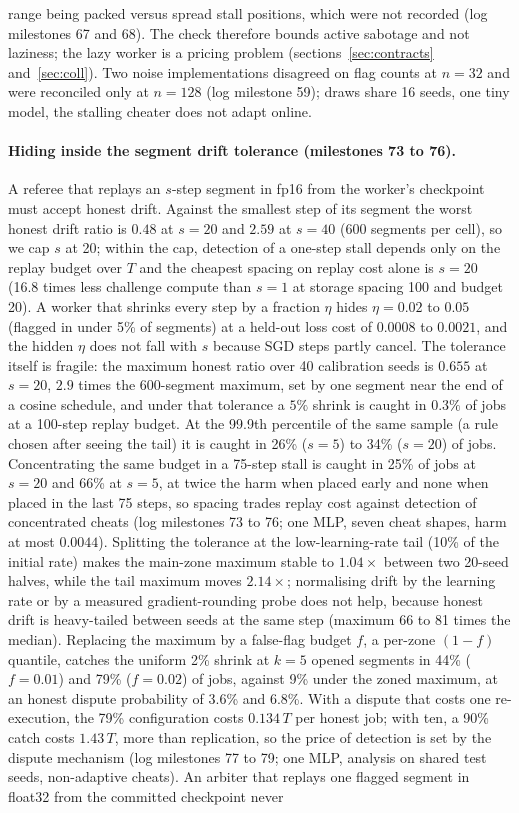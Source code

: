 \documentclass[sigconf,anonymous]{acmart}
\begin{document}
range being packed versus spread stall positions, which were not recorded (log milestones 67 and 68). The check therefore bounds active sabotage and not laziness; the lazy worker is a pricing problem (sections~\ref{sec:contracts} and~\ref{sec:coll}). Two noise implementations disagreed on flag counts at $n=32$ and were reconciled only at $n=128$ (log milestone 59); draws share 16 seeds, one tiny model, the stalling cheater does not adapt online.

\paragraph{Hiding inside the segment drift tolerance (milestones 73 to 76).} A referee that replays an $s$-step segment in fp16 from the worker's checkpoint must accept honest drift. Against the smallest step of its segment the worst honest drift ratio is $0.48$ at $s=20$ and $2.59$ at $s=40$ (600 segments per cell), so we cap $s$ at 20; within the cap, detection of a one-step stall depends only on the replay budget over $T$ and the cheapest spacing on replay cost alone is $s=20$ (16.8 times less challenge compute than $s=1$ at storage spacing 100 and budget 20). A worker that shrinks every step by a fraction $\eta$ hides $\eta = 0.02$ to $0.05$ (flagged in under 5\% of segments) at a held-out loss cost of $0.0008$ to $0.0021$, and the hidden $\eta$ does not fall with $s$ because SGD steps partly cancel. The tolerance itself is fragile: the maximum honest ratio over 40 calibration seeds is $0.655$ at $s=20$, $2.9$ times the 600-segment maximum, set by one segment near the end of a cosine schedule, and under that tolerance a $5\%$ shrink is caught in $0.3\%$ of jobs at a 100-step replay budget. At the 99.9th percentile of the same sample (a rule chosen after seeing the tail) it is caught in 26\% ($s=5$) to 34\% ($s=20$) of jobs. Concentrating the same budget in a 75-step stall is caught in 25\% of jobs at $s=20$ and 66\% at $s=5$, at twice the harm when placed early and none when placed in the last 75 steps, so spacing trades replay cost against detection of concentrated cheats (log milestones 73 to 76; one MLP, seven cheat shapes, harm at most $0.0044$). Splitting the tolerance at the low-learning-rate tail (10\% of the initial rate) makes the main-zone maximum stable to $1.04\times$ between two 20-seed halves, while the tail maximum moves $2.14\times$; normalising drift by the learning rate or by a measured gradient-rounding probe does not help, because honest drift is heavy-tailed between seeds at the same step (maximum 66 to 81 times the median). Replacing the maximum by a false-flag budget $f$, a per-zone $(1-f)$ quantile, catches the uniform 2\% shrink at $k=5$ opened segments in 44\% ($f=0.01$) and 79\% ($f=0.02$) of jobs, against 9\% under the zoned maximum, at an honest dispute probability of 3.6\% and 6.8\%. With a dispute that costs one re-execution, the 79\% configuration costs $0.134\,T$ per honest job; with ten, a 90\% catch costs $1.43\,T$, more than replication, so the price of detection is set by the dispute mechanism (log milestones 77 to 79; one MLP, analysis on shared test seeds, non-adaptive cheats). An arbiter that replays one flagged segment in float32 from the committed checkpoint never 
\end{document}

